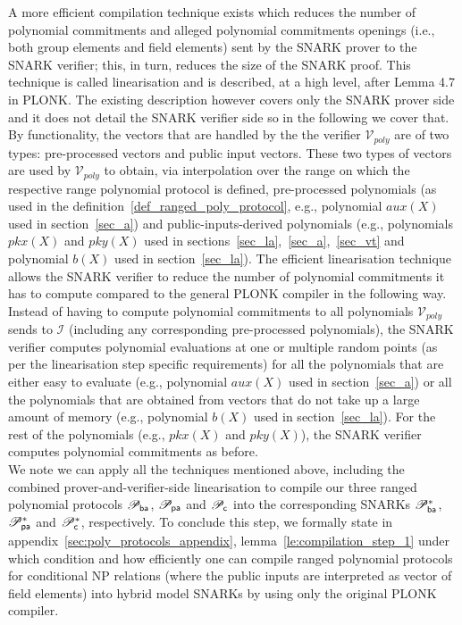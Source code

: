 \noindent A more efficient compilation technique exists which reduces the number of polynomial commitments and alleged polynomial commitments openings 
(i.e., both group elements and field elements) sent by the SNARK prover to the SNARK verifier; this, in turn, reduces the size of the SNARK proof. 
This technique is called linearisation and is described, at a high level, after Lemma 4.7 in PLONK. The existing description however covers only the 
SNARK prover side and it does not detail the SNARK verifier side so in the following we cover that. \\

\noindent By functionality, the vectors that are handled by the the verifier $\mathcal{V}_{poly}$ are 
of two types: pre-processed vectors and public input vectors. These two types of vectors are used by $\mathcal{V}_{poly}$ 
to obtain, via interpolation over the range on which the respective range polynomial protocol is defined, pre-processed polynomials 
(as used in the definition~\ref{def_ranged_poly_protocol}, e.g., polynomial $aux(X)$ used in section~\ref{sec_a}) and 
public-inputs-derived polynomials (e.g., polynomials $pkx(X)$ and $pky(X)$ used in sections~\ref{sec_la},~\ref{sec_a},~\ref{sec_vt} 
and polynomial $b(X)$ used in section~\ref{sec_la}). The efficient linearisation technique allows the SNARK verifier to reduce the 
number of polynomial commitments it has to compute compared to the general PLONK compiler in the following way. Instead of 
having to compute polynomial commitments to all polynomials $\mathcal{V}_{poly}$ sends to $\mathcal{I}$ (including any corresponding 
pre-processed polynomials), the SNARK verifier computes polynomial evaluations at one or multiple random points (as per the linearisation 
step specific requirements) for all the polynomials that are either easy to evaluate (e.g., polynomial $aux(X)$ used in section~\ref{sec_a}) or 
all the polynomials that are obtained from vectors that do not take up a large amount of memory (e.g., polynomial $b(X)$ used in section~\ref{sec_la}). 
For the rest of the polynomials (e.g., $\mathit{pkx}(X)$ and $\mathit{pky}(X)$), the SNARK verifier computes polynomial commitments as before.\\

\noindent We note we can apply all the techniques mentioned above, including the combined prover-and-verifier-side linearisation 
to compile our three ranged polynomial protocols $\mathscr{P}_{\mathsf{ba}}$, $\mathscr{P}_{\mathsf{pa}}$ and $\mathscr{P}_{\mathsf{c}}$ into the corresponding SNARKs $\mathscr{P}_{\mathsf{ba}}^{\ast}$, $\mathscr{P}_{\mathsf{pa}}^{\ast}$ and $\mathscr{P}_{\mathsf{c}}^{\ast}$, respectively. 
To conclude this step, we formally state in appendix~\ref{sec:poly_protocols_appendix}, lemma~\ref{le:compilation_step_1} under which condition and how efficiently 
one can compile ranged polynomial protocols for conditional NP relations (where the public inputs are interpreted as vector of field elements) 
into hybrid model SNARKs by using only the original PLONK compiler. \\

